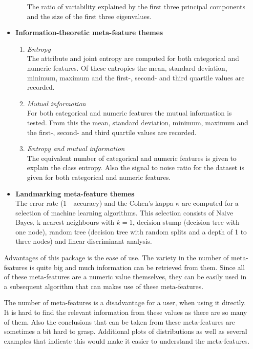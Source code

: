 \documentclass[10pt,a4paper]{report}
\begin{document}
\begin{itemize}
\begin{enumerate}
			The ratio of variability explained by the first three principal components and the size of the first three eigenvalues.
		\end{enumerate}
		\item \textbf{Information-theoretic meta-feature themes} \\ 
		\begin{enumerate}
			\item \textit{Entropy} \\
			The attribute and joint entropy are computed for both categorical and numeric features. Of these entropies the mean, standard deviation, minimum, maximum and the first-, second- and third quartile values are recorded.
			\item \textit{Mutual information} \\
			For both categorical and numeric features the mutual information is tested. From this the mean, standard deviation, minimum, maximum and the first-, second- and third quartile values are recorded.
			\item \textit{Entropy and mutual information} \\
			The equivalent number of categorical and numeric features is given to explain the class entropy. Also the signal to noise ratio for the dataset is given for both categorical and numeric features.
		\end{enumerate}
		\item \textbf{Landmarking meta-feature themes} \\
		The error rate (1 - accuracy) and the Cohen's kappa $\kappa$ are computed for a selection of machine learning algorithms. This selection consists of Naive Bayes, k-nearest neighbours with $k=1$, decision stump (decision tree with one node), random tree (decision tree with random splits and a depth of 1 to three nodes) and linear discriminant analysis.
	\end{itemize}
	
	Advantages of this package is the ease of use. The variety in the number of meta-features is quite big and much information can be retrieved from them. Since all of these meta-features are a numeric value themselves, they can be easily used in a subsequent algorithm that can makes use of these meta-features. 
	
	The number of meta-features is a disadvantage for a user, when using it directly. It is hard to find the relevant information from these values as there are so many of them. Also the conclusions that can be taken from these meta-features are sometimes a bit hard to grasp. Additional plots of distributions as well as several examples that indicate this would make it easier to understand the meta-features.
	
\end{document}
